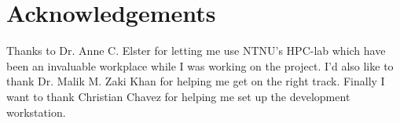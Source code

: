 \section*{Acknowledgements}

Thanks to Dr. Anne C. Elster for letting me use NTNU's HPC-lab which have been an 
invaluable workplace while I was working on the project. I'd also like to thank
Dr. Malik M. Zaki Khan for helping me get on the right track. Finally I want to
thank Christian Chavez for helping me set up the development workstation.
